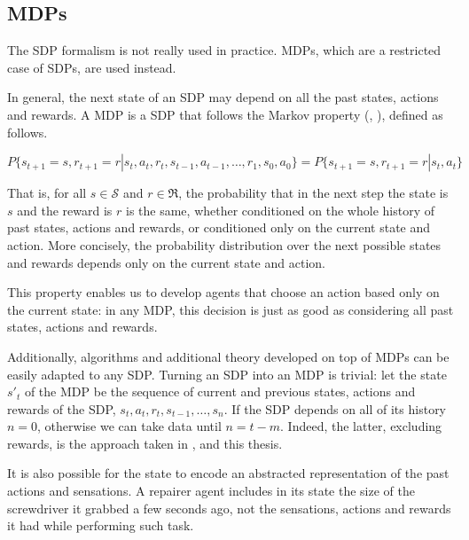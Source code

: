 \subsection{\aclp{MDP}}
The \ac{SDP} formalism is not really used in practice. \acfp{MDP}, which are a
restricted case of \acp{SDP}, are used instead.

In general, the next state of an \ac{SDP} may depend on all the past states,
actions and rewards. A \acl{MDP} is a \acl{SDP} that follows the Markov property
(\cite[Section~3.5]{sutton1998introduction},
\cite[Section~17.1]{russell2009aima}), defined as follows.

\begin{equation}
  P \lbrace s_{t+1} = s, r_{t+1} = r | s_t,a_t,r_t,s_{t-1},a_{t-1}, \dots, r_1, s_0, a_0 \rbrace =
  P \lbrace s_{t+1} = s, r_{t+1} = r | s_t,a_t \rbrace
\end{equation}

That is, for all $s\in\mathcal{S}$ and $r\in\mathfrak{R}$, the probability that
in the next step the state is $s$ and the reward is $r$ is the same, whether
conditioned on the whole history of past states, actions and rewards, or
conditioned only on the current state and action. More concisely, the
probability distribution over the next possible states and rewards depends only
on the current state and action.

This property enables us to develop agents that choose an action
based only on the current state: in any \ac{MDP}, this decision is just as good as
considering all past states, actions and rewards.

Additionally, algorithms and additional theory developed on top of \acp{MDP} can
be easily adapted to any \ac{SDP}. Turning an \ac{SDP} into an \ac{MDP} is
trivial: let the state $s'_t$ of the \ac{MDP} be the sequence of current and
previous states, actions and rewards of the SDP, $s_t,a_t,r_t,s_{t-1},\dots,s_n$. If the
\ac{SDP} depends on all of its history $n=0$, otherwise we can take data until
$n=t-m$. Indeed, the latter, excluding rewards, is the approach taken in
\cite{mnih2015human}, \cite{kulkarni2016hierarchical} and this thesis.

It is also possible for the state to encode an abstracted representation of the
past actions and sensations. A repairer agent includes in its state the size of
the screwdriver it grabbed a few seconds ago, not the sensations, actions and
rewards it had while performing such task.

